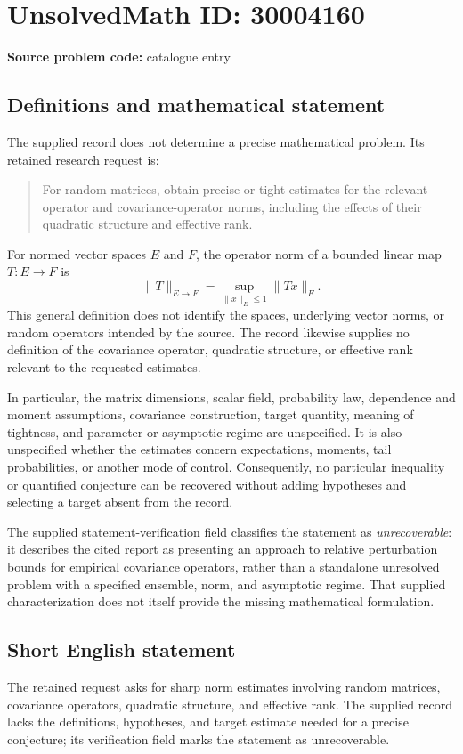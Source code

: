 \documentclass[11pt]{article}
\begin{document}
\section*{UnsolvedMath ID: 30004160}
\textbf{Source problem code:} catalogue entry
\subsection{Definitions and mathematical statement}
The supplied record does not determine a precise mathematical problem. Its retained research request is:
\begin{quote}
For random matrices, obtain precise or tight estimates for the relevant operator and covariance-operator norms, including the effects of their quadratic structure and effective rank.
\end{quote}
For normed vector spaces \(E\) and \(F\), the operator norm of a bounded linear map \(T:E\to F\) is
\[
\|T\|_{E\to F}=\sup_{\|x\|_E\leq 1}\|Tx\|_F.
\]
This general definition does not identify the spaces, underlying vector norms, or random operators intended by the source. The record likewise supplies no definition of the covariance operator, quadratic structure, or effective rank relevant to the requested estimates.

In particular, the matrix dimensions, scalar field, probability law, dependence and moment assumptions, covariance construction, target quantity, meaning of tightness, and parameter or asymptotic regime are unspecified. It is also unspecified whether the estimates concern expectations, moments, tail probabilities, or another mode of control. Consequently, no particular inequality or quantified conjecture can be recovered without adding hypotheses and selecting a target absent from the record.

The supplied statement-verification field classifies the statement as \emph{unrecoverable}: it describes the cited report as presenting an approach to relative perturbation bounds for empirical covariance operators, rather than a standalone unresolved problem with a specified ensemble, norm, and asymptotic regime. That supplied characterization does not itself provide the missing mathematical formulation.
\subsection{Short English statement}
The retained request asks for sharp norm estimates involving random matrices, covariance operators, quadratic structure, and effective rank. The supplied record lacks the definitions, hypotheses, and target estimate needed for a precise conjecture; its verification field marks the statement as unrecoverable.
\end{document}
